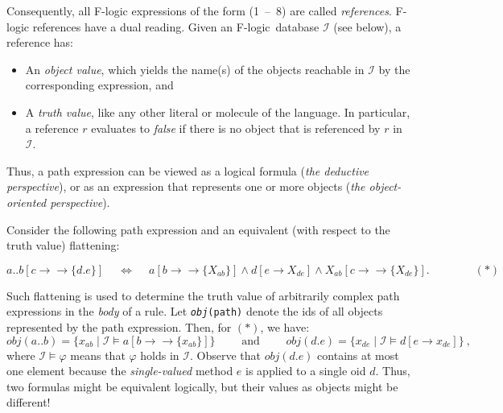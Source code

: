 \documentclass[11pt]{article}
\newcommand{\obj}{\textit{obj}\xspace}
\newcommand{\db}[1]{\ensuremath{\mathcal{#1}}}
\newcommand{\fd}{\ensuremath{{\rightarrow}}}                   %
\newcommand{\mvd}{\ensuremath{{\rightarrow\!\!\!\!\rightarrow}}}  %
\newcommand{\fl}{{F-logic}\xspace}
\begin{document}
Consequently, all F-logic expressions of the form (1~--~8) are called
\emph{references}. F-logic references have a dual reading. Given an
\fl\ database \db I (see below), a reference has:
\begin{itemize}
\item An \emph{object value}, which yields the name(s) of the objects
  reachable in \db I by the corresponding expression, and 
\item A \emph{truth value}, like any other literal or molecule of the
  language. In particular, a reference $r$ evaluates to \emph{false} if
  there is no object that is referenced by $r$ in \db I.
\end{itemize}
Thus, a path expression can be viewed as a logical formula (\emph{the
  deductive perspective}), or as an expression that represents one or more
objects (\emph{the object-oriented perspective}).

Consider the following path expression and an equivalent (with respect to
the truth value) flattening:

\begin{displaymath}
a..b[c\mvd\{d.e\}] \quad\ \Leftrightarrow \quad\  a[b\mvd\{X_{ab}\}]
\land d[e\fd X_{de}] \land X_{ab}[c\mvd\{X_{de}\}]. \hspace{4em} (*)
\end{displaymath}


\noindent
Such flattening is used to determine the truth value of arbitrarily complex
path expressions in the \emph{body} of a rule.  Let {\tt \obj(path)} denote
the ids of all objects represented by the path expression. Then, for $(*)$,
we have:
\begin{displaymath}
\obj(a..b) = \{x_{ab} \mid \db I \models a[b\mvd\{x_{ab}\}]\}
\qquad\textrm{ and }\qquad \obj(d.e) = \{x_{de} \mid \db I \models d[e\fd 
x_{de}]\} ~,
\end{displaymath}
%
where $\db I \models \varphi$ means that $\varphi$ holds in \db I.
Observe that $\obj(d.e)$ contains at most one element because the
\emph{single-valued} method $e$ is applied to a single oid $d$. Thus, two
formulas might be equivalent logically, but their values as objects might
be different!
\end{document}
